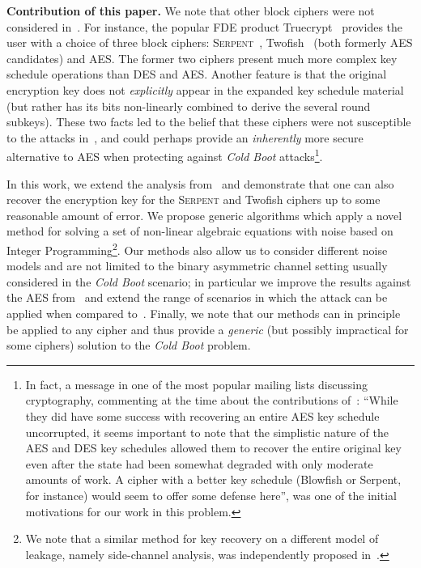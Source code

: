 \documentclass{llncs}
\newcommand{\Serpent}{\textsc{Serpent}\xspace}
\newcommand{\Twofish}{Twofish\xspace}
\newcommand{\coldboot}{\emph{Cold Boot}\xspace}
\begin{document}
{\bf Contribution of this paper.} We note that other block ciphers were not considered in~\cite{coldboot}. For instance, the popular FDE product Truecrypt~\cite{truecrypt} provides the user with a choice of three block ciphers: \Serpent~\cite{biham-anderson-knudsen-fse98}, \Twofish~\cite{twofish} (both formerly AES candidates) and AES. The former two ciphers present much more complex key schedule operations than DES and AES. Another feature is that the original encryption key does not \emph{explicitly} appear in the expanded key schedule material (but rather has its bits non-linearly combined to derive the several round subkeys). These two facts led to the belief that these ciphers were not susceptible to the attacks in~\cite{coldboot}, and could perhaps provide an {\it inherently} more secure alternative to AES when protecting against \coldboot 
attacks\footnote{In fact, a message in one of the most popular mailing lists discussing cryptography, commenting at the time about the contributions of~\cite{coldboot}: ``While they did have some success with recovering an entire AES key schedule uncorrupted, it seems important to note that the simplistic nature of the AES and DES key schedules allowed them to recover the
entire original key even after the state had been somewhat degraded with only moderate amounts of work. A cipher with a better key
schedule (Blowfish or Serpent, for instance) would seem to offer some defense here''\cite{crypto-list}, was one of the initial motivations for our work in this problem.}. 

In this work, we extend the analysis from~\cite{coldboot} and demonstrate that one can also recover the encryption key for the \Serpent and \Twofish ciphers up to some reasonable amount of error. We propose generic algorithms which apply a novel method for solving a set of non-linear algebraic equations with noise based on Integer Programming\footnote{We note that a similar method for key recovery on a different model of leakage, namely side-channel analysis, was independently proposed in~\cite{oren-side-channel}.}. Our methods also allow us to consider different noise models and are not limited to the binary asymmetric channel setting usually considered in the \coldboot scenario; in particular we improve the results against the AES from~\cite{coldboot} and extend the range of scenarios in which the attack can be applied when compared to~\cite{coldboot,tsow,aes-sat}. Finally, we note that our methods can in principle be applied to any cipher and thus provide a \emph{generic} (but possibly impractical for some ciphers) solution to the \coldboot problem.  
\end{document}
